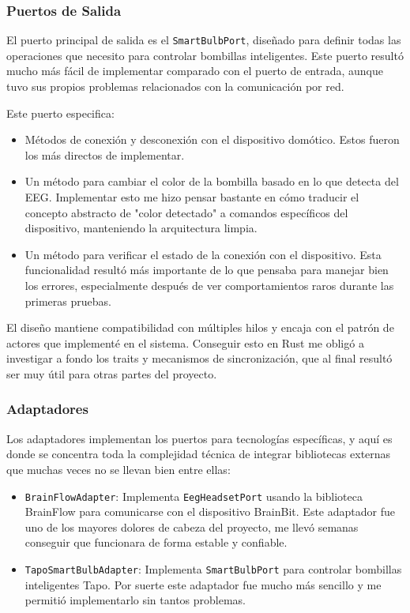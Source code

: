 \subsubsection{Puertos de Salida}

El puerto principal de salida es el \texttt{SmartBulbPort}, diseñado para definir todas las operaciones que necesito para controlar bombillas inteligentes. Este puerto resultó mucho más fácil de implementar comparado con el puerto de entrada, aunque tuvo sus propios problemas relacionados con la comunicación por red.

Este puerto especifica:

\begin{itemize}
    \item Métodos de conexión y desconexión con el dispositivo domótico. Estos fueron los más directos de implementar.
    \item Un método para cambiar el color de la bombilla basado en lo que detecta del EEG. Implementar esto me hizo pensar bastante en cómo traducir el concepto abstracto de "color detectado" a comandos específicos del dispositivo, manteniendo la arquitectura limpia.
    \item Un método para verificar el estado de la conexión con el dispositivo. Esta funcionalidad resultó más importante de lo que pensaba para manejar bien los errores, especialmente después de ver comportamientos raros durante las primeras pruebas.
\end{itemize}

El diseño mantiene compatibilidad con múltiples hilos y encaja con el patrón de actores que implementé en el sistema. Conseguir esto en Rust me obligó a investigar a fondo los traits y mecanismos de sincronización, que al final resultó ser muy útil para otras partes del proyecto.

\subsubsection{Adaptadores}

Los adaptadores implementan los puertos para tecnologías específicas, y aquí es donde se concentra toda la complejidad técnica de integrar bibliotecas externas que muchas veces no se llevan bien entre ellas:

\begin{itemize}
    \item \texttt{BrainFlowAdapter}: Implementa \texttt{EegHeadsetPort} usando la biblioteca BrainFlow para comunicarse con el dispositivo BrainBit. Este adaptador fue uno de los mayores dolores de cabeza del proyecto, me llevó semanas conseguir que funcionara de forma estable y confiable.
    \item \texttt{TapoSmartBulbAdapter}: Implementa \texttt{SmartBulbPort} para controlar bombillas inteligentes Tapo. Por suerte este adaptador fue mucho más sencillo y me permitió implementarlo sin tantos problemas.
\end{itemize}

